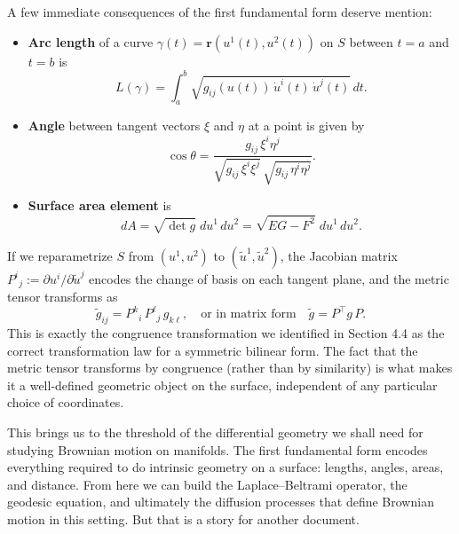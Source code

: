 \documentclass{article}
\begin{document}
A few immediate consequences of the first fundamental form deserve mention:
\begin{itemize}
    \item \textbf{Arc length} of a curve $\gamma(t) = \mathbf{r}(u^1(t), u^2(t))$ on $S$ between $t = a$ and $t = b$ is
    $$L(\gamma) = \int_a^b \sqrt{g_{ij}(u(t))\, \dot u^i(t)\, \dot u^j(t)}\, dt.$$
    \item \textbf{Angle} between tangent vectors $\xi$ and $\eta$ at a point is given by
    $$\cos\theta = \frac{g_{ij}\, \xi^i \eta^j}{\sqrt{g_{ij}\, \xi^i \xi^j}\, \sqrt{g_{ij}\, \eta^i \eta^j}}.$$
    \item \textbf{Surface area element} is
    $$dA = \sqrt{\det g}\; du^1\, du^2 = \sqrt{EG - F^2}\; du^1\, du^2.$$
\end{itemize}
 
If we reparametrize $S$ from $(u^1, u^2)$ to $(\tilde u^1, \tilde u^2)$, the Jacobian matrix $P^i{}_j := \partial u^i / \partial \tilde u^j$ encodes the change of basis on each tangent plane, and the metric tensor transforms as
$$\tilde g_{ij} = P^k{}_i\, P^\ell{}_j\, g_{k\ell}, \quad \text{or in matrix form} \quad \tilde g = P^\top g\, P.$$
This is exactly the congruence transformation we identified in Section 4.4 as the correct transformation law for a symmetric bilinear form. The fact that the metric tensor transforms by congruence (rather than by similarity) is what makes it a well-defined geometric object on the surface, independent of any particular choice of coordinates.
 
This brings us to the threshold of the differential geometry we shall need for studying Brownian motion on manifolds. The first fundamental form encodes everything required to do intrinsic geometry on a surface: lengths, angles, areas, and distance. From here we can build the Laplace--Beltrami operator, the geodesic equation, and ultimately the diffusion processes that define Brownian motion in this setting. But that is a story for another document.
 
\end{document}
